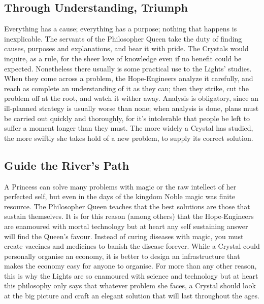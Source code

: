 \subsection*{Through Understanding, Triumph}
Everything has a cause; everything has a purpose; nothing that happens is inexplicable. The servants of the Philosopher Queen take the duty of finding causes, purposes and explanations, and bear it with pride. The Crystals would inquire, as a rule, for the sheer love of knowledge even if no benefit could be expected. Nonetheless there usually is some practical use to the Lights' studies. When they come across a problem, the Hope-Engineers analyze it carefully, and reach as complete an understanding of it as they can; then they strike, cut the problem off at the root, and watch it wither away. Analysis is obligatory, since an ill-planned strategy is usually worse than none; when analysis is done, plans must be carried out quickly and thoroughly, for it's intolerable that people be left to suffer a moment longer than they must. The more widely a Crystal has studied, the more swiftly she takes hold of a new problem, to supply its correct solution.

\subsection*{Guide the River's Path}
A Princess can solve many problems with magic or the raw intellect of her perfected self, but even in the days of the kingdom Noble magic was finite resource. The Philosopher Queen teaches that the best solutions are those that sustain themselves. It is for this reason (among others) that the Hope-Engineers are enamoured with mortal technology but at heart any self sustaining answer will find the Queen's favour. Instead of curing diseases with magic, you must create vaccines and medicines to banish the disease forever. While a Crystal could personally organise an economy, it is better to design an infrastructure that makes the economy easy for anyone to organise. For more than any other reason, this is why the Lights are so enamoured with science and technology but at heart this philosophy only says that whatever problem she faces, a Crystal should look at the big picture and craft an elegant solution that will last throughout the ages.

